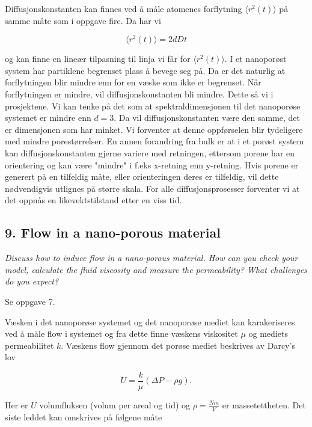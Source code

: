 \documentclass[a4paper,10pt]{article}
\begin{document}
Diffusjonskonstanten kan finnes ved å måle atomenes forflytning $\langle r^2(t)\rangle$ på samme måte som i oppgave fire. Da har vi

\begin{equation}
 \langle r^2(t)\rangle = 2dDt
\end{equation}                                                                  

og kan finne en lineær tilpasning til linja vi får for $\langle r^2(t)\rangle$. 
I et nanoporøst system har partiklene begrenset plass å bevege seg på. Da er det naturlig at forflytningen blir mindre enn for en væske som ikke er begrenset. Når forflytningen er mindre, vil diffusjonskonstanten bli mindre. Dette så vi i prosjektene. Vi kan tenke på det som at spektraldimensjonen til det nanoporøse systemet er mindre enn $d=3$. Da vil diffusjonskonstanten være den samme, det er dimensjonen som har minket. Vi forventer at denne oppførselen blir tydeligere med mindre porestørrelser. En annen forandring fra bulk er at i et porøst system kan diffusjonskonstanten gjerne variere med retningen, ettersom porene har en orientering og kan være "mindre" i f.eks x-retning enn y-retning. Hvis porene er generert på en tilfeldig måte, eller orienteringen deres er tilfeldig, vil dette nødvendigvis utlignes på større skala. For alle diffusjonsprosesser forventer vi at det oppnås en likevektstilstand etter en viss tid. 


\subsection*{9. Flow in a nano-porous material}
\textit{Discuss how to induce flow in a nano-porous material. How can you check
your model, calculate the fluid viscosity and measure the permeability? What
challenges do you expect?}

Se oppgave 7. 

Væsken i det nanoporøse systemet og det nanoporøse mediet kan karakeriseres ved å måle flow i systemet og fra dette finne væskens viskositet $\mu$ og mediets permeabilitet $k$. Væskens flow gjennom det porøse mediet beskrives av Darcy's lov

\begin{equation}
 U = \frac{k}{\mu}(\Delta P -\rho g).
\end{equation}

Her er $U$ volumfluksen (volum per areal og tid) og $\rho=\frac{Nm}{V}$ er massetettheten. Det siste leddet kan omskrives på følgene måte
\end{document}
